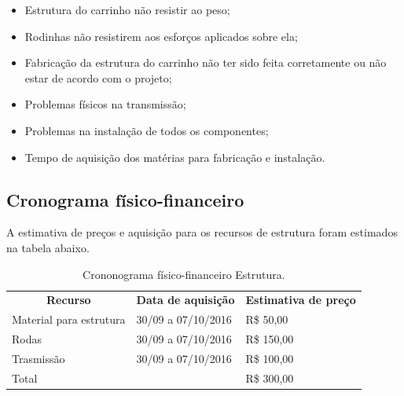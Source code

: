 \begin{itemize}
\item Estrutura do carrinho não resistir ao peso;
\item Rodinhas não resistirem aos esforços aplicados sobre ela;
\item Fabricação da estrutura do carrinho não ter sido feita corretamente ou não estar de acordo com o projeto;
\item Problemas físicos na transmissão;
\item Problemas na instalação de todos os componentes;
\item Tempo de aquisição dos matérias para fabricação e instalação.
\end{itemize}

\subsection{Cronograma físico-financeiro}
A estimativa de preços e aquisição para os recursos de estrutura foram estimados na tabela abaixo.

\begin{table}[h]
 \centering
 {\renewcommand\arraystretch{1.25}
 \caption{Crononograma físico-financeiro Estrutura.}
 \begin{tabular}{ l l l }
  \cline{1-1}\cline{2-2}\cline{3-3}  
    \multicolumn{1}{|c|}{\textbf{Recurso} \centering } &
    \multicolumn{1}{c|}{\textbf{Data de aquisição} \centering } &
    \multicolumn{1}{c|}{\textbf{Estimativa de preço} \centering }
  \\  
  \cline{1-1}\cline{2-2}\cline{3-3}  
    \multicolumn{1}{|p{3.850cm}|}{Material para estrutura \centering } &
    \multicolumn{1}{p{4.217cm}|}{30/09 a 07/10/2016 \centering } &
    \multicolumn{1}{p{4.217cm}|}{R\$ 50,00 \centering }
  \\  
  \cline{1-1}\cline{2-2}\cline{3-3}  
    \multicolumn{1}{|p{3.850cm}|}{Rodas \centering } &
    \multicolumn{1}{p{4.217cm}|}{30/09 a 07/10/2016 \centering } &
    \multicolumn{1}{p{4.217cm}|}{R\$ 150,00 \centering }
  \\  
  \cline{1-1}\cline{2-2}\cline{3-3}  
    \multicolumn{1}{|p{3.850cm}|}{Trasmissão \centering } &
    \multicolumn{1}{p{4.217cm}|}{30/09 a 07/10/2016 \centering } &
    \multicolumn{1}{p{4.217cm}|}{R\$ 100,00 \centering }
  \\  
  \cline{1-1}\cline{2-2}\cline{3-3}  
    \multicolumn{2}{|p{3.850cm}|}{Total \centering } &
    \multicolumn{1}{p{4.217cm}|}{R\$ 300,00 \centering }
  \\  
  \hline

 \end{tabular} }
\end{table}


